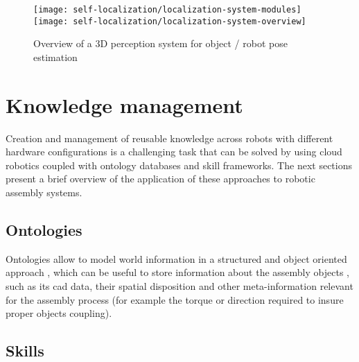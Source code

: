 \begin{figure}[H]
	\centering
	\texttt{[image: self-localization/localization-system-modules]}
	\texttt{[image: self-localization/localization-system-overview]}
	\caption[Overview of a 3D perception system for object / robot pose estimation]{Overview of a 3D perception system for object / robot pose estimation \cite{Costa2016Elsevier}}
	\label{fig:localization-system}
\end{figure}



\section{Knowledge management}

Creation and management of reusable knowledge across robots with different hardware configurations is a challenging task that can be solved by using cloud robotics coupled with ontology databases and skill frameworks. The next sections present a brief overview of the application of these approaches to robotic assembly systems.


\subsection{Ontologies}

Ontologies allow to model world information in a structured and object oriented approach \cite{Stenmark2015}, which can be useful to store information about the assembly objects \cite{Perzylo2015}, such as its \gls{cad} data, their spatial disposition and other meta-information relevant for the assembly process (for example the torque or direction required to insure proper objects coupling).



\subsection{Skills}

